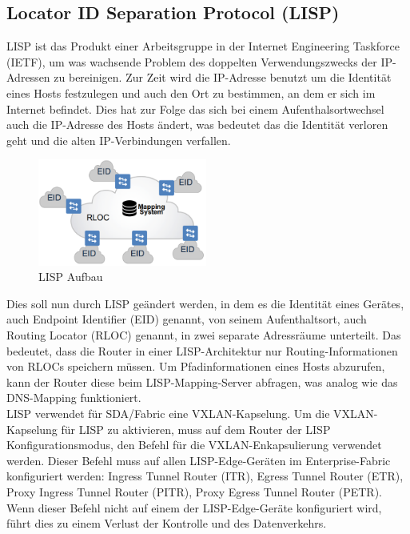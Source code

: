\subsection{Locator ID Separation Protocol (LISP)} 
LISP ist das Produkt einer Arbeitsgruppe in der Internet Engineering Taskforce (IETF), um was wachsende Problem des doppelten Verwendungszwecks der IP-Adressen zu bereinigen. Zur Zeit wird die IP-Adresse benutzt um die Identität eines Hosts festzulegen und auch den Ort zu bestimmen, an dem er sich im Internet befindet. Dies hat zur Folge das sich bei einem Aufenthalsortwechsel auch die IP-Adresse des Hosts ändert, was bedeutet das die Identität verloren geht und die alten IP-Verbindungen verfallen. \\

\begin{figure}[H]
	\centering
	\includegraphics[height=3.5cm]{img/lisp.png}
	\caption{LISP Aufbau}
	\label{fig:LISP Aufbau}
\end{figure}

Dies soll nun durch LISP geändert werden, in dem es die Identität eines Gerätes, auch Endpoint Identifier (EID) genannt, von seinem Aufenthaltsort, auch Routing Locator (RLOC) genannt, in zwei separate Adressräume unterteilt. Das bedeutet, dass die Router in einer LISP-Architektur nur Routing-Informationen von RLOCs speichern müssen. Um Pfadinformationen eines Hosts abzurufen, kann der Router diese beim LISP-Mapping-Server abfragen, was analog wie das DNS-Mapping funktioniert. \\

LISP verwendet für SDA/Fabric eine VXLAN-Kapselung. Um die VXLAN-Kapselung für LISP zu aktivieren, muss auf dem Router der LISP Konfigurationsmodus, den Befehl für die VXLAN-Enkapsulierung verwendet werden. Dieser Befehl muss auf allen LISP-Edge-Geräten im Enterprise-Fabric konfiguriert werden: Ingress Tunnel Router (ITR), Egress Tunnel Router (ETR), Proxy Ingress Tunnel Router (PITR), Proxy Egress Tunnel Router (PETR). Wenn dieser Befehl nicht auf einem der LISP-Edge-Geräte konfiguriert wird, führt dies zu einem Verlust der Kontrolle und des Datenverkehrs.  \cite{rfc-6830}


